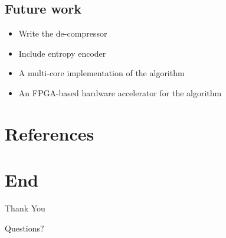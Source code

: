 \documentclass{beamer}
\begin{document}
\subsection{Future work}
\begin{frame}
    \begin{itemize}
        \item Write the de-compressor
        \item Include entropy encoder
        \item A multi-core implementation of the algorithm
        \item An FPGA-based hardware accelerator for the algorithm
    \end{itemize}
\end{frame}

\section{References}
\begin{frame}
    \printbibliography
\end{frame}

\section{End}
\begin{frame}
    \centering
    \huge{Thank You}
    \par
    \huge{Questions?}
\end{frame}
\end{document}
